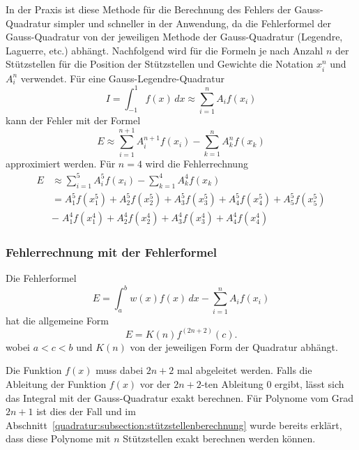 In der Praxis ist diese Methode für die Berechnung des Fehlers der Gauss-Quadratur
simpler und schneller in der Anwendung, da die Fehlerformel der Gauss-Quadratur
von der jeweiligen Methode der Gauss-Quadratur (Legendre, Laguerre, etc.) abhängt.
Nachfolgend wird für die Formeln je nach Anzahl $n$ der Stützstellen für die
Position der Stützstellen und Gewichte die Notation $x_{i}^{n}$ und $A_{i}^{n}$ verwendet.
Für eine Gauss-Legendre-Quadratur 
\begin{equation}
    I 
    = 
    \int_{-1}^{1}f(x)\,dx 
    \approx 
    \sum_{i=1}^{n}A_{i}f(x_{i})
\end{equation}
kann der Fehler mit der Formel
\begin{equation}
    E 
    \approx 
    \sum_{i=1}^{n+1}A_{i}^{n+1}f(x_{i})
    -
    \sum_{k=1}^{n}A_{k}^{n}f(x_{k})
\end{equation}
approximiert werden. Für $n = 4$ wird die Fehlerrechnung 
\begin{align}
    E
    &\approx
    \sum_{i=1}^{5}A_{i}^{5}f(x_{i})
    -
    \sum_{k=1}^{4}A_{k}^{4}f(x_{k}) \\
    &=
    A_{1}^{5}f(x_{1}^{5})+A_{2}^{5}f(x_{2}^{5})+A_{3}^{5}f(x_{3}^{5})+A_{4}^{5}f(x_{4}^{5})+A_{5}^{5}f(x_{5}^{5}) 
    \\
    &-\;
    A_{1}^{4}f(x_{1}^{4})+A_{2}^{4}f(x_{2}^{4})+A_{3}^{4}f(x_{3}^{4})+A_{4}^{4}f(x_{4}^{4})
\end{align}

\subsubsection{Fehlerrechnung mit der Fehlerformel}
Die Fehlerformel
\begin{equation}
    E = \int_{a}^{b} w(x) f(x) \, dx - \sum_{i=1}^{n}A_{i}f(x_{i})    
\end{equation} 
hat die allgemeine Form
\begin{equation}
    E = K(n)f^{(2n+2)}(c).
\end{equation}
wobei $a<c<b$ und $K(n)$ von der jeweiligen Form der Quadratur abhängt.

Die Funktion $f(x)$ muss dabei $2n+2$ mal abgeleitet werden.
Falls die Ableitung der Funktion $f(x)$ vor der $2n+2$-ten Ableitung $0$ ergibt,
lässt sich das Integral mit der Gauss-Quadratur exakt berechnen.
Für Polynome vom Grad $2n+1$ ist dies der Fall und im 
Abschnitt~\ref{quadratur:subsection:stützstellenberechnung} wurde bereits 
erklärt, dass diese Polynome mit $n$ Stützstellen
exakt berechnen werden können.

